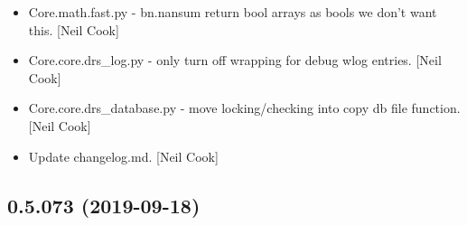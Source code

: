 \documentclass[a4paper,10pt,english]{report}
\begin{document}
\begin{itemize}
\item {} 
Core.math.fast.py - bn.nansum return bool arrays as bools we don’t
want this. {[}Neil Cook{]}

\item {} 
Core.core.drs\_log.py - only turn off wrapping for debug wlog entries.
{[}Neil Cook{]}

\item {} 
Core.core.drs\_database.py - move locking/checking into copy db file
function. {[}Neil Cook{]}

\item {} 
Update changelog.md. {[}Neil Cook{]}

\end{itemize}


\subsection{0.5.073 (2019-09-18)}
\end{document}
